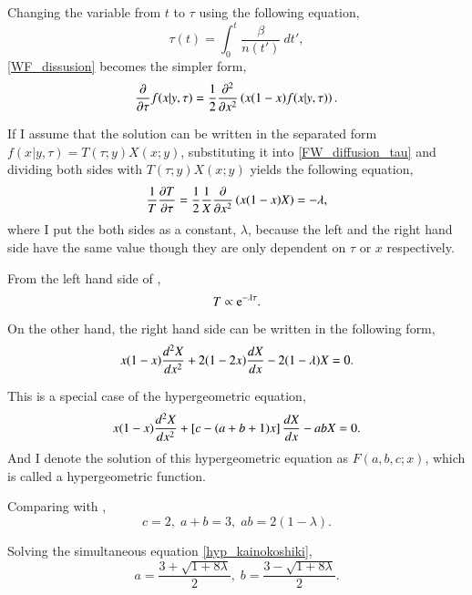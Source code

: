 \documentclass{article}
\begin{document}
Changing the variable from $t$ to $\tau$ using the following equation,
\begin{equation}
 \tau(t) = \int_{0}^{t} \frac{\beta}{n(t')} \: dt',
\end{equation}
\eqref{WF_dissusion} becomes the simpler form,
\begin{equation}
 \frac{\partial {}}{\partial {\tau}} f(x|y,\tau) = \frac{1}{2} \frac{\partial^2}{\partial x^2} \left( x(1-x) f(x|y,\tau) \right).\label{FW_diffusion_tau}
\end{equation}

If I assume that the solution can be written in the separated form $f(x|y,\tau) = T(\tau;y) X(x;y)$,
substituting it into \eqref{FW_diffusion_tau} and dividing both sides with $T(\tau;y) X(x;y)$ yields the following equation,
\begin{equation}
 \frac{1}{T}\frac{\partial {T}}{\partial {\tau}} = \frac{1}{2}\frac{1}{X}\frac{\partial {}}{\partial {x^2}} \left( x(1-x) X \right) = -\lambda,\label{hensu_bunri}
\end{equation}
where I put the both sides as a constant, $\lambda$, because the left and the right hand side have the same value though they are only dependent on $\tau$ or $x$ respectively.

From the left hand side of ,
\begin{equation}
 T \propto \mathrm{e}^{-\lambda \tau}.
\end{equation}

On the other hand, the right hand side can be written in the following form,
\begin{equation}
 x(1-x)\frac{d^2 X}{d x^2} + 2(1-2x) \frac{d {X}}{d {x}} - 2(1 - \lambda) X = 0.\label{hypgeo_case}
\end{equation}

This is a special case of the hypergeometric equation,
\begin{equation}
 x(1-x)\frac{d^2 X}{d x^2} + \left[ c - (a+b+1)x \right] \frac{d {X}}{d {x}} - ab X = 0.\label{hypgeo_concrete}
\end{equation}
And I denote the solution of this hypergeometric equation as $F(a, b, c; x)$, which is called a hypergeometric function.

Comparing  with ,
\begin{equation}
 c = 2, \; a+b = 3, \; ab = 2(1-\lambda).\label{hyp_kainokoshiki}
\end{equation}

Solving the simultaneous equation \eqref{hyp_kainokoshiki},
\begin{equation}
 a = \frac{3 + \sqrt{1 + 8\lambda}}{2}, \; b = \frac{3 - \sqrt{1 + 8\lambda}}{2}.\label{a_b_solution}
\end{equation}
\end{document}

